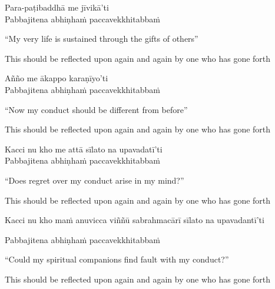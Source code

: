 Para-paṭibaddhā me jīvikā'ti\\
Pabbajitena abhiṇhaṁ paccavekkhitabbaṁ

\begin{english-verses}
  ``My very life is sustained through the gifts of others''
  \begin{english-hangtogether-verses}
    This should be reflected upon again and again by one who has gone forth
  \end{english-hangtogether-verses}
\end{english-verses}

Añño me ākappo karaṇīyo'ti\\
Pabbajitena abhiṇhaṁ paccavekkhitabbaṁ

\begin{english-verses}
  ``Now my conduct should be different from before''\makeatletter\hyperlink{endnote101-appendix}\makeatother
  \begin{english-hangtogether-verses}
    This should be reflected upon again and again by one who has gone forth
  \end{english-hangtogether-verses}
\end{english-verses}

Kacci nu kho me attā sīlato na upavadatī'ti\\
Pabbajitena abhiṇhaṁ paccavekkhitabbaṁ

\begin{english-verses}
  ``Does regret over my conduct arise in my mind?''
  \begin{english-hangtogether-verses}
    This should be reflected upon again and again by one who has gone forth
  \end{english-hangtogether-verses}
\end{english-verses}

\begin{pali-hang}
  Kacci nu kho maṁ anuvicca viññū sabrahmacārī sīlato na upavadantī'ti
\end{pali-hang}
\begin{pali-hangtogether}
  Pabbajitena abhiṇhaṁ paccavekkhitabbaṁ
\end{pali-hangtogether}

\begin{english-verses}
  ``Could my spiritual companions find fault with my conduct?''
  \begin{english-hangtogether-verses}
    This should be reflected upon again and again by one who has gone forth
  \end{english-hangtogether-verses}
\end{english-verses}

